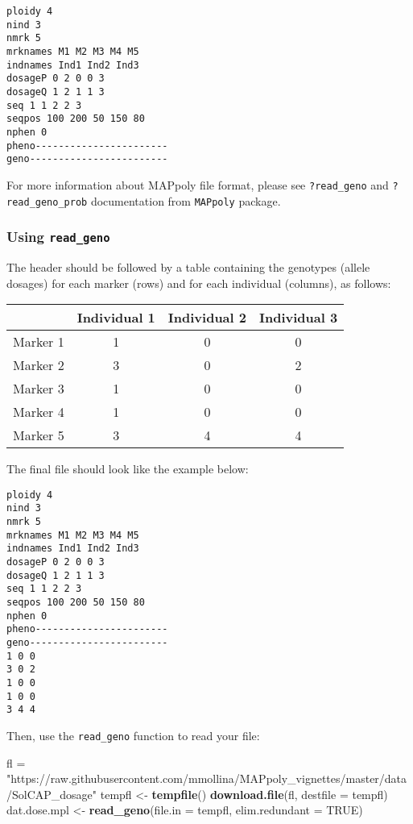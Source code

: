 \documentclass[
]{article}
\newenvironment{Shaded}{}{}
\newcommand{\DataTypeTok}[1]{\textcolor[rgb]{0.56,0.13,0.00}{#1}}
\newcommand{\KeywordTok}[1]{\textcolor[rgb]{0.00,0.44,0.13}{\textbf{#1}}}
\newcommand{\NormalTok}[1]{#1}
\newcommand{\OtherTok}[1]{\textcolor[rgb]{0.00,0.44,0.13}{#1}}
\newcommand{\StringTok}[1]{\textcolor[rgb]{0.25,0.44,0.63}{#1}}
\begin{document}
\begin{verbatim}
ploidy 4
nind 3
nmrk 5
mrknames M1 M2 M3 M4 M5
indnames Ind1 Ind2 Ind3
dosageP 0 2 0 0 3
dosageQ 1 2 1 1 3
seq 1 1 2 2 3
seqpos 100 200 50 150 80
nphen 0
pheno-----------------------
geno------------------------
\end{verbatim}

For more information about MAPpoly file format, please see
\texttt{?read\_geno} and \texttt{?read\_geno\_prob} documentation from
\texttt{MAPpoly} package.

\hypertarget{using-read_geno}{%
\subsubsection{\texorpdfstring{Using
\texttt{read\_geno}}{Using read\_geno}}\label{using-read_geno}}

The header should be followed by a table containing the genotypes
(allele dosages) for each marker (rows) and for each individual
(columns), as follows:

\begin{longtable}[]{@{}lccc@{}}
\toprule
& Individual 1 & Individual 2 & Individual 3\tabularnewline
\midrule
\endhead
Marker 1 & 1 & 0 & 0\tabularnewline
Marker 2 & 3 & 0 & 2\tabularnewline
Marker 3 & 1 & 0 & 0\tabularnewline
Marker 4 & 1 & 0 & 0\tabularnewline
Marker 5 & 3 & 4 & 4\tabularnewline
\bottomrule
\end{longtable}

The final file should look like the example below:

\begin{verbatim}
ploidy 4
nind 3
nmrk 5
mrknames M1 M2 M3 M4 M5
indnames Ind1 Ind2 Ind3
dosageP 0 2 0 0 3
dosageQ 1 2 1 1 3
seq 1 1 2 2 3
seqpos 100 200 50 150 80
nphen 0
pheno-----------------------
geno------------------------
1 0 0
3 0 2
1 0 0
1 0 0
3 4 4
\end{verbatim}

Then, use the \texttt{read\_geno} function to read your file:

\begin{Shaded}
\begin{Highlighting}[]
\NormalTok{fl =}\StringTok{ "https://raw.githubusercontent.com/mmollina/MAPpoly_vignettes/master/data/SolCAP_dosage"}
\NormalTok{tempfl <-}\StringTok{ }\KeywordTok{tempfile}\NormalTok{()}
\KeywordTok{download.file}\NormalTok{(fl, }\DataTypeTok{destfile =}\NormalTok{ tempfl)}
\NormalTok{dat.dose.mpl <-}\StringTok{ }\KeywordTok{read_geno}\NormalTok{(}\DataTypeTok{file.in  =}\NormalTok{ tempfl, }\DataTypeTok{elim.redundant =} \OtherTok{TRUE}\NormalTok{)}
\end{Highlighting}
\end{Shaded}
\end{document}
